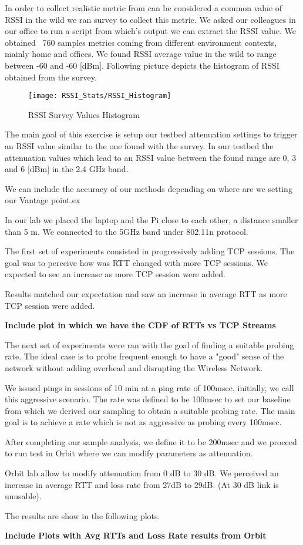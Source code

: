 In order to collect realistic metric from can be considered a common value of RSSI in the wild we ran survey to collect this metric. We asked our colleagues in our office to run a script from which's output we can extract the RSSI value. We obtained ~760 samples metrics coming from different environment contexts,  mainly home and offices. We found RSSI average value in the wild to range between -60 and -60 [dBm]. Following picture depicts the histogram of RSSI obtained from the survey.

\begin{figure}[h]
	\centering
	\texttt{[image: RSSI\_Stats/RSSI\_Histogram]}
	\caption{RSSI Survey Values Histogram}
	\label{fig:vSDN_Controller_DC}
\end{figure}


The main goal of this exercise is setup our testbed attenuation settings to trigger an RSSI value similar to the one found with the survey. In our testbed the attenuation values which lead to an RSSI value between the found range are 0, 3 and 6 [dBm] in the 2.4 GHz band.


We can include the accuracy of our methods depending on where are we setting our Vantage point.ex

In our lab we placed the laptop and the Pi close to each other, a distance smaller than 5 m. We connected to the 5GHz band under 802.11n protocol.

The first set of experiments consisted in progressively adding TCP sessions. The goal was to perceive how was RTT changed with more TCP sessions. We expected to see an increase as more TCP session were added.

Results matched our expectation and saw an increase in average RTT as more TCP session were added.

\textbf{Include plot in which we have the CDF of RTTs vs TCP Streams}

The next set of experiments were ran with the goal of finding a suitable probing rate. The ideal case is to probe frequent enough to have a "good" sense of the network without adding overhead and disrupting the Wireless Network.

We issued pings in sessions of 10 min at a ping rate of 100msec, initially, we call this aggressive scenario. The rate was defined to be 100msec to set our baseline from which we derived our sampling to obtain a suitable probing rate. The main goal is to achieve a rate which is not as aggressive as probing every 100msec.

After completing our sample analysis, we define it to be 200msec and we proceed to run test in Orbit where we can modify parameters as attenuation.

Orbit lab allow to modify attenuation from 0 dB to 30 dB. We perceived an increase in average RTT and loss rate from 27dB to 29dB. (At 30 dB link is unusable).

The results are show in the following plots.

\textbf{Include Plots with Avg RTTs and Loss Rate results from Orbit}




